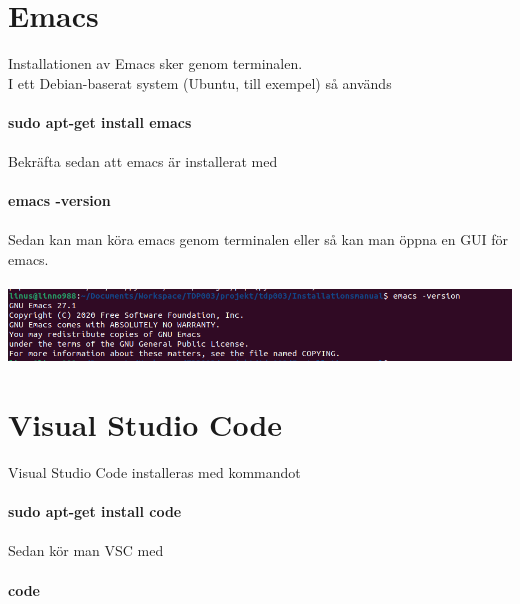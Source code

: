 \documentclass{TDP003mall}
\begin{document}
\section{Emacs}
Installationen av Emacs sker genom terminalen.\\
I ett Debian-baserat system (Ubuntu, till exempel) så används\\\\
\textbf{sudo apt-get install emacs}\\\\
Bekräfta sedan att emacs är installerat med\\\\
\textbf{emacs -version}\\\\
Sedan kan man köra emacs genom terminalen eller så kan man öppna en GUI för emacs.\\\\
\includegraphics[scale=0.5]{emacs_version}


\section{Visual Studio Code}
Visual Studio Code installeras med kommandot\\\\
\textbf{sudo apt-get install code}\\\\ 
Sedan kör man VSC med\\\\
\textbf{code}
\end{document}
